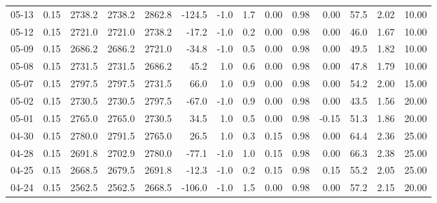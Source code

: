 \begin{threeparttable}
{\begin{tabular}{lrrrrrrrrrrrrr}
  05-13 &     0.15 & 2738.2 & 2738.2 & 2862.8 &     -124.5 &                     -1.0 &                 1.7 &       0.00 &      0.98 &           0.00 &             57.5 &            2.02 &                  10.00 \\
  05-12 &     0.15 & 2721.0 & 2721.0 & 2738.2 &      -17.2 &                     -1.0 &                 0.2 &       0.00 &      0.98 &           0.00 &             46.0 &            1.67 &                  10.00 \\
  05-09 &     0.15 & 2686.2 & 2686.2 & 2721.0 &      -34.8 &                     -1.0 &                 0.5 &       0.00 &      0.98 &           0.00 &             49.5 &            1.82 &                  10.00 \\
  05-08 &     0.15 & 2731.5 & 2731.5 & 2686.2 &       45.2 &                      1.0 &                 0.6 &       0.00 &      0.98 &           0.00 &             47.8 &            1.79 &                  10.00 \\
  05-07 &     0.15 & 2797.5 & 2797.5 & 2731.5 &       66.0 &                      1.0 &                 0.9 &       0.00 &      0.98 &           0.00 &             54.2 &            2.00 &                  15.00 \\
  05-02 &     0.15 & 2730.5 & 2730.5 & 2797.5 &      -67.0 &                     -1.0 &                 0.9 &       0.00 &      0.98 &           0.00 &             43.5 &            1.56 &                  20.00 \\
  05-01 &     0.15 & 2765.0 & 2765.0 & 2730.5 &       34.5 &                      1.0 &                 0.5 &       0.00 &      0.98 &          -0.15 &             51.3 &            1.86 &                  20.00 \\
  04-30 &     0.15 & 2780.0 & 2791.5 & 2765.0 &       26.5 &                      1.0 &                 0.3 &       0.15 &      0.98 &           0.00 &             64.4 &            2.36 &                  25.00 \\
  04-28 &     0.15 & 2691.8 & 2702.9 & 2780.0 &      -77.1 &                     -1.0 &                 1.0 &       0.15 &      0.98 &           0.00 &             66.3 &            2.38 &                  25.00 \\
  04-25 &     0.15 & 2668.5 & 2679.5 & 2691.8 &      -12.3 &                     -1.0 &                 0.2 &       0.15 &      0.98 &           0.15 &             55.2 &            2.05 &                  25.00 \\
  04-24 &     0.15 & 2562.5 & 2562.5 & 2668.5 &     -106.0 &                     -1.0 &                 1.5 &       0.00 &      0.98 &           0.00 &             57.2 &            2.15 &                  20.00 \\

\end{tabular}}
\end{threeparttable}
